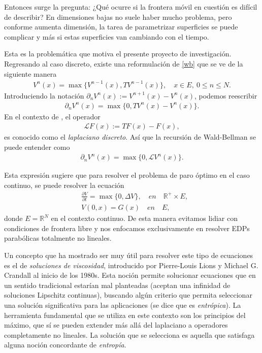 \documentclass{article}
\numberwithin{equation}{section}
\begin{document}
Entonces surge la pregunta: ¿Qué ocurre si la frontera móvil en cuestión es difícil de describir?  En dimensiones bajas no suele haber mucho problema, pero conforme aumenta dimensión, la tarea de parametrizar  superficies se puede complicar y más si estas superficies van cambiando con el tiempo. 

Esta es la problemática que motiva el presente proyecto de investigación. Regresando al caso discreto, existe una reformulación de \eqref{wb} que se ve de la siguiente manera
\begin{align}
        V^n(x) = \max\{V^{n-1}(x), TV^{n-1}(x)\}, \quad x \in E, \: 0\leq n\leq N.
    \end{align}
Introduciendo la notación $\partial_nV^n(x) := V^{n+1}(x)-V^n(x)$, podemos reescribir
\begin{align}\label{no-lineal}
    \partial_nV^n(x) = \max\{0, TV^{n}(x)-V^{n}(x)\}.
\end{align}
En el contexto de \cite{lawler2010random}, el operador
\begin{align*}
   \mathcal{L}F(x) := TF(x)-F(x),
\end{align*}
es conocido como el \emph{laplaciano discreto}. Así que la recursión de Wald-Bellman se puede entender como
\begin{align}
    \partial_nV^n(x) = \max\{0, \mathcal{L}V^{n}(x)\}.
\end{align}

Esta expresión sugiere que para resolver el problema de paro 
óptimo en el caso continuo, se puede resolver la ecuación
\begin{align}\label{parabolic-non-linear}
    &\frac{\partial V}{\partial t} = \max\{0,\Delta V\}, \quad en \quad  \mathbb{R}^+\times E,\\
    &V(0,x) = G(x) \quad en \quad E,
\end{align}
donde $E = \mathbb{R}^N$ en el contexto continuo.
De esta manera evitamos lidiar con condiciones de frontera libre y nos enfocamos exclusivamente en resolver EDPs parabólicas totalmente no lineales. 

Un concepto que ha mostrado ser muy útil para resolver este tipo de ecuaciones es el de \emph{soluciones de viscosidad}, introducido por  Pierre-Louis Lions y Michael G. Crandall al inicio de los 1980s. Esta noción permite solucionar ecuaciones que en un sentido tradicional estarían mal planteadas (aceptan una infinidad de soluciones Lipschitz continuas), buscando algún criterio que permita seleccionar una solución significativa para las aplicaciones (se dice que es \emph{entrópica}). La herramienta fundamental que se utiliza en este contexto son los principios del máximo, que sí se pueden extender más allá del laplaciano a operadores completamente no lineales. La solución que se selecciona es aquella que satisfaga alguna noción concordante de \emph{entropía}.  
\end{document}
